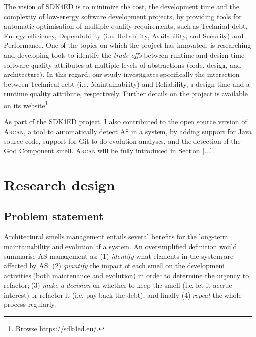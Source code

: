 The vision of SDK4ED is to minimize the cost, the development time and the complexity of low-energy software development projects, by providing tools for automatic optimisation of multiple quality requirements, such as Technical debt, Energy efficiency, Dependability (i.e. Reliability, Availability, and Security) and Performance. 
One of the topics on which the project has innovated, is researching and developing tools to identify the \textit{trade-offs} between runtime and design-time software quality attributes at multiple levels of abstractions (code, design, and architecture).
In this regard, our study investigates specifically the interaction between Technical debt (i.e. Maintainability) and Reliability, a design-time and a runtime quality attribute, respectively. Further details on the project is available on its website\footnote{Browse \url{https://sdk4ed.eu/}.}.

As part of the SDK4ED project, I also contributed to the open source version of \textsc{Arcan}, a tool to automatically detect AS in a system, by adding support for Java source code, support for Git to do evolution analyses, and the detection of the God Component smell.
\textsc{Arcan} will be fully introduced in Section \ref{...}.

\section{Research design}\label{sec:intro:research-design}
\subsection{Problem statement}\label{sec:intro:problem-statement} 
Architectural smells management entails several benefits for the long-term maintainability and evolution of a system.
An oversimplified definition would summarise AS management as: (1) \emph{identify} what elements in the system are affected by AS; (2) \emph{quantify} the impact of each smell on the development activities (both maintenance and evolution) in order to determine the urgency to refactor; (3) \emph{make a decision} on whether to keep the smell (i.e. let it accrue interest) or refactor it (i.e. pay back the debt); and finally (4) \emph{repeat} the whole process regularly.

